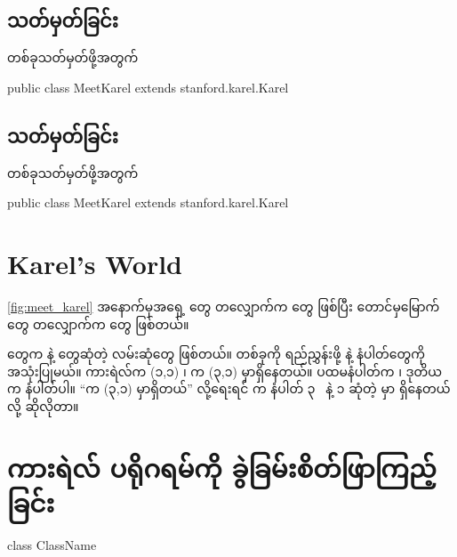 \begin{sloppypar}
\subsection{ သတ်မှတ်ခြင်း}
 တစ်ခုသတ်မှတ်ဖို့အတွက် 

\begin{lstcodesimple}[caption=\myttlcode{class} သတ်မှတ်သည့် ဆင်းတက်စ်]
    public class MeetKarel extends stanford.karel.Karel{
            
    }
\end{lstcodesimple}

\subsection{ သတ်မှတ်ခြင်း}
 တစ်ခုသတ်မှတ်ဖို့အတွက် 

\begin{lstcodesimple}[caption=\myttlcode{class} သတ်မှတ်သည့် ဆင်းတက်စ်]
    public class MeetKarel extends stanford.karel.Karel{
            
    }
\end{lstcodesimple}

\section{Karel's World}
\Fig \vref*{fig:meet_karel} 
အနောက်မှအရှေ့ \mmcorner တွေ တလျှောက်က \enstreet တွေ ဖြစ်ပြီး တောင်မှမြောက် \mmcorner တွေ တလျှောက်က \enavenue တွေ ဖြစ်တယ်။ 

\mmcorner တွေက \mmavenue နဲ့ \mmstreet တွေဆုံတဲ့ လမ်းဆုံတွေ ဖြစ်တယ်။ \mmcorner တစ်ခုကို ရည်ညွှန်းဖို့ \mmavenue နဲ့ \mmstreet နံပါတ်‌တွေကို အသုံးပြုမယ်။ ကားရဲလ်က (၁,၁) \mmcorner၊ \mmbeeper က (၃,၁) \mmcorner မှာရှိနေတယ်။ ပထမ‌‌နံပါတ်က \mmavenue ၊ ဒုတိယက \mmstreet နံပါတ်ပါ။ “\mmbeeper က (၃,၁) \mmcorner မှာရှိတယ်”  လို့ရေးရင် \mmbeeper က နံပါတ် ၃ \mmavenue\ နဲ့ ၁ \mmstreet ဆုံတဲ့ \mmcorner မှာ ရှိနေတယ်လို့ ဆိုလိုတာ။



\section{ကားရဲလ် ပရိုဂရမ်ကို ခွဲခြမ်းစိတ်ဖြာကြည့်ခြင်း}

\begin{lstcodesimple}[language = Java, float=ht]
    class ClassName {
            
    }
\end{lstcodesimple}


\end{sloppypar}
